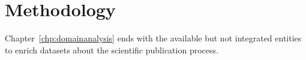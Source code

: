 \documentclass{ou-report}
\begin{document}









\chapter{Methodology}
\label{chp:methodology}

Chapter~\ref{chp:domainanalysis} ends with the available but not integrated 
entities to enrich datasets about the scientific publication process.
\end{document}
